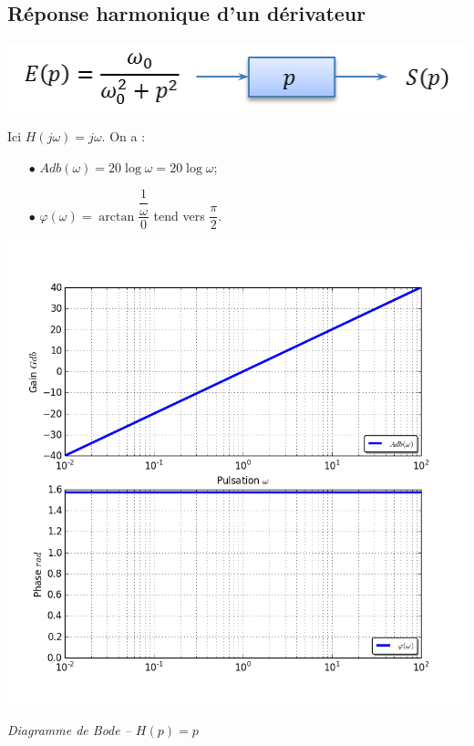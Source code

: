 \documentclass[10pt,oneside]{article}
\begin{document}
\subsection{Réponse harmonique d'un dérivateur}
\begin{minipage}[c]{.48\linewidth}
\begin{center}
\includegraphics[width=.9\textwidth]{png/derivateur_bloc}
\end{center}

Ici $H(j\omega)= j\omega$. On a :
\begin{itemize}
\item [$\bullet$] $Adb(\omega)=20 \log {\omega}=20\log \omega$;
\item [$\bullet$] $\varphi(\omega)= \arctan \dfrac{\dfrac{1}{\omega}}{0}$ tend vers $\dfrac{\pi}{2}$.
\end{itemize}

\end{minipage}\hfill
\begin{minipage}[c]{.48\linewidth}
\begin{center}
\includegraphics[width=.9\textwidth]{png/derivateur_bode}

\textit{Diagramme de Bode -- $H(p)=p$}
\end{center}
\end{minipage}
\end{document}
